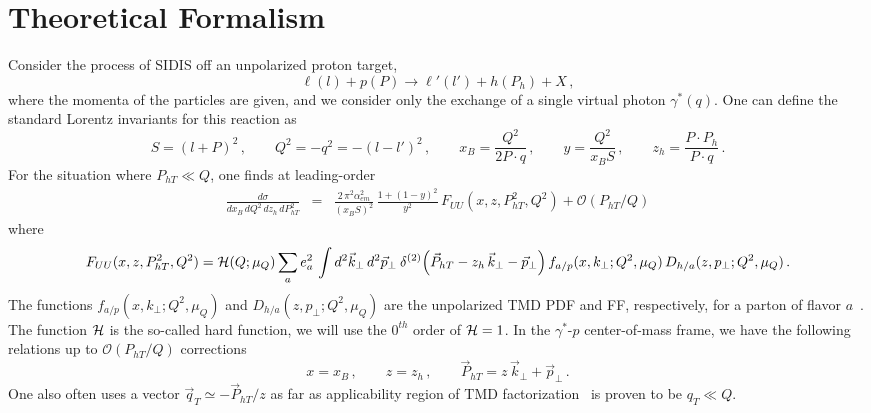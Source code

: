 \documentclass[final,3p,times,onecolumn,sort&compress,hidelinks]{elsarticle}
\newcommand\3[1]{\boldsymbol{#1}}
\begin{document}
\section{Theoretical Formalism}
\label{s:model}
Consider the process of SIDIS off an unpolarized proton target,
\begin{equation}
\ell(l)+p(P)\to \ell'(l') + h(P_h) + X\,,
\end{equation}
where the momenta of the particles are given, and we consider only the exchange of a single virtual photon $\gamma^*(q)$.  One can define the standard Lorentz invariants for this reaction as
\begin{equation}
S = (l+P)^2\,, \quad\quad Q^2 = -q^2 = -(l-l')^2\,, \quad\quad x_B = \frac{Q^2} {2P\cdot q}\,, \quad\quad y = \frac{Q^2} {x_B S}\,, \quad\quad z_h = \frac{P\cdot P_h} {P\cdot q}\,.
\end{equation}
For the situation where $P_{hT}\ll Q$, one finds at leading-order~\cite{Bacchetta:2006tn}
\begin{eqnarray}
\frac{d\sigma}
{dx_B\, dQ^2 \, dz_h \, dP_{hT}^2} &\!\!\!=\!\!\!&
\frac {2 \, \pi^2 \alpha_{em}^2}{(x_B S)^2} \, \frac{ 1 + (1-y)^2 }{y^2}\,F_{UU}(x,z,P_{hT}^2,Q^2) + \mathcal{O}(P_{hT}/Q)
\label{e:dsigma}
\end{eqnarray}
where \cite{Collins:2011zzd}
\begin{equation}
F_{UU}(x,z,P_{hT}^2,Q^2)  = {\cal H} (Q; \mu_Q)\sum_{a} e_a^2 \,
\int d^2\vec{k}_\perp \, d^2\vec{p}_\perp
\> \delta ^{(2)}\Big(\vec{P}_{hT} - z_h\,\vec{k}_\perp -\vec{p}_\perp\Big)\,
f_{a/p} (x, k_{\perp}; Q^2, \mu_Q) \, D_{h/a}(z, p_{\perp}; Q^2, \mu_Q)\,. \label{e:FUU} \\
\end{equation}
The functions $f_{a/p} (x, k_{\perp}; Q^2, \mu_Q)$ and $D_{h/a}(z, p_{\perp}; Q^2, \mu_Q)$ are the unpolarized TMD PDF and FF, respectively, for a parton of flavor $a$~\cite{Bacchetta:2006tn,Collins:2011zzd}.  The function ${\cal H}$ is the so-called hard function, we will use the $0^{th}$ order of ${\cal H} = 1$. In the $\gamma^*$-$p$ center-of-mass frame, we have the following relations up to $\mathcal{O}(P_{hT}/Q)$ corrections~\cite{Bacchetta:2006tn}
\begin{equation}
 x=x_B\,, \quad\quad z=z_h\,,\quad\quad \vec{P}_{hT} = z\,\vec{k}_\perp + \vec{p}_\perp\,.\label{e:LT_relations}
\end{equation}
One also often uses a vector $\vec{q}_T \simeq -\vec{P}_{hT}/z$ as far as applicability region of TMD factorization~\cite{Collins:2011zzd} is proven to be $q_T \ll Q$.
\end{document}
